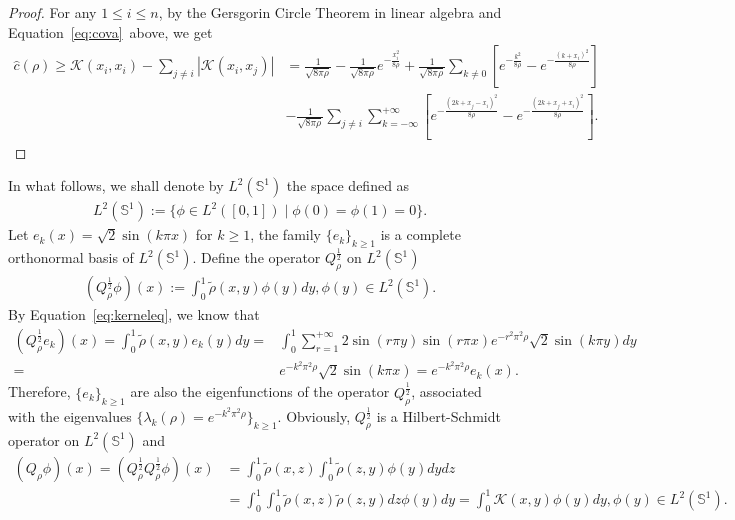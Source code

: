 \documentclass[11pt]{article}
\numberwithin{equation}{section}%
\numberwithin{figure}{section}%
\theoremstyle{remark}
\begin{document}
	\begin{proof}
			For any $1\leq i\leq n$, by the Gersgorin Circle Theorem in linear algebra and Equation~\eqref{eq:cova}~above, we get
		\begin{align*}
			\hat{c}(\rho)\geq\mathcal{K}(x_{i},x_{i})-\sum_{j\neq i}|\mathcal{K}(x_{i},x_{j})|
			&= \frac{1}{\sqrt{8\pi\rho}}-\frac{1}{\sqrt{8\pi\rho}}e^{-\frac{x_{i}^{2}}{8\rho}}+ \frac{1}{\sqrt{8\pi\rho}}\sum_{k\neq 0}\left[e^{-\frac{k^{2}}{8\rho}}-e^{-\frac{(k+x_{i})^{2}}{8\rho}}\right]\\
			&- \frac{1}{\sqrt{8\pi\rho}}\sum_{j\neq i}\sum_{k=-\infty}^{+\infty}\left[e^{-\frac{(2k+x_{j}-x_{i})^{2}}{8\rho}}-e^{-\frac{(2k+x_{j}+x_{i})^{2}}{8\rho}}\right].
		\end{align*}
	\end{proof}	
	In what follows, we shall denote by $L^{2}(\mathbb{S}^{1})$ the space defined as
	\begin{align*}
		L^{2}(\mathbb{S}^{1}):=\{\phi\in L^{2}([0,1])\mid \phi(0)=\phi(1)=0\}.
	\end{align*}
Let	$e_{k}(x)=\sqrt{2}\sin(k\pi x)$ for $k\geq 1$, the family $\{e_{k}\}_{k\geq 1}$ is a complete orthonormal basis of $L^{2}(\mathbb{S}^{1})$. Define the operator $Q_{\rho}^{\frac{1}{2}}$ on $L^{2}(\mathbb{S}^{1})$ 
	\begin{align}\label{eq:ope}
		(Q_{\rho}^{\frac{1}{2}}\phi)(x):=\int_{0}^{1}\tilde{\rho}(x,y)\phi(y)dy, \phi(y)\in L^{2}(\mathbb{S}^{1}).
	\end{align}
By Equation~\eqref{eq:kerneleq}, we know that 	
	\begin{align*}
		(Q_{\rho}^{\frac{1}{2}}e_{k})(x)=\int_{0}^{1}\tilde{\rho}(x,y)e_{k}(y)dy=&\int_{0}^{1}\sum_{r=1}^{+\infty}2\sin(r\pi y)\sin(r\pi x)e^{-r^{2}\pi^{2}\rho}\sqrt{2}\sin(k\pi y)dy\\
		=&e^{-k^{2}\pi^{2}\rho}\sqrt{2}\sin(k\pi x)=e^{-k^{2}\pi^{2}\rho}e_{k}(x).
	\end{align*}
	Therefore, $\{e_{k}\}_{k\geq 1}$ are also the eigenfunctions of the operator $Q_{\rho}^{\frac{1}{2}}$, associated with the eigenvalues $\{\lambda_{k}(\rho)=e^{-k^{2}\pi^{2}\rho}\}_{k\geq1}$. Obviously,
	$Q_{\rho}^{\frac{1}{2}}$ is a Hilbert-Schmidt operator on $L^{2}(\mathbb{S}^{1})$ and
	\begin{align*}
		(Q_{\rho}\phi)(x)=(Q^{\frac{1}{2}}_{\rho}Q^{\frac{1}{2}}_{\rho}\phi)(x)&=\int_{0}^{1}\tilde{\rho}(x,z)\int_{0}^{1}\tilde{\rho}(z,y)\phi(y)dydz\\
		&=\int_{0}^{1}\int_{0}^{1}\tilde{\rho}(x,z)\tilde{\rho}(z,y)dz\phi(y)dy=\int_{0}^{1}\mathcal{K}(x,y)\phi(y)dy, \phi(y)\in L^{2}(\mathbb{S}^{1}).
	\end{align*}
\end{document}
